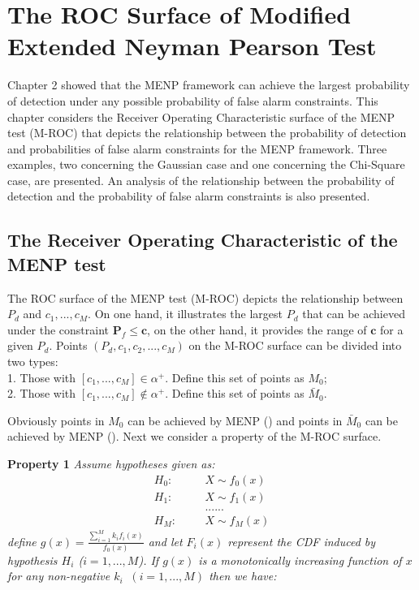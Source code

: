\chapter{The ROC Surface of Modified Extended Neyman Pearson Test}
Chapter 2 showed that the MENP framework can achieve the largest probability of detection under any possible probability of false alarm constraints. This chapter considers the Receiver Operating Characteristic surface of the MENP test (M-ROC) that depicts the relationship between the probability of detection and probabilities of false alarm constraints for the MENP framework. Three examples,  two concerning the Gaussian case and one concerning the Chi-Square case, are presented. An analysis of the relationship between the probability of detection and the probability of false alarm constraints is also presented.  

\section{The Receiver Operating Characteristic of the MENP test}

The ROC surface of the MENP test (M-ROC) depicts the relationship between $P_d$ and $c_1, ..., c_M$. On one hand, it  illustrates the largest $P_d$ that can be achieved under the constraint $\mathbf{P}_{f} \leq \mathbf{c}$, on the other hand, it provides the range of $\mathbf{c}$ for a given $P_d$.
Points $(P_d, c_1, c_2, ..., c_M)$ on the M-ROC  surface can be divided into two types: 
\\1. Those with $[c_1,  ..., c_M] \in \alpha^+$. Define this set of points as $M_0$; 
\\2. Those with $[c_1,  ..., c_M] \notin \alpha^+$. Define this set of points as $\bar{M}_0$. 

Obviously points in $M_0$ can be achieved by MENP () and points in $\bar{M}_0$ can  be achieved by MENP (). Next we consider a property of the M-ROC surface.

\noindent \textbf{Property 1}
\noindent \textit{
  \noindent Assume hypotheses given as:
}
\begin{equation}
  \begin{split}
	H_0:\;\;\;\;\;\;&X \sim f_0(x)\\
	H_1:\;\;\;\;\;\;&X \sim f_1(x)\\
	&......\\
	H_M:\;\;\;\;\;\;&X \sim f_M(x)
  \end{split}
\end{equation}
\textit{
  define $g(x) = \frac{\sum_{i=1}^{M}k_if_i(x)}{f_0(x)}$ and let $F_i(x)$ represent the CDF induced by hypothesis $H_i$ ($i = 1, ..., M$). If $g(x)$ is a monotonically increasing function of $x$ for any non-negative $k_i\;\;(i = 1, ..., M)$  then we have:}

